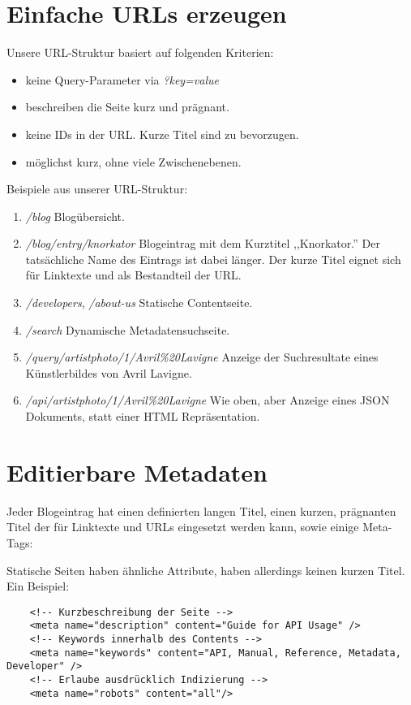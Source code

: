 \section{Einfache URLs erzeugen}
Unsere URL-Struktur basiert auf folgenden Kriterien:
\begin{itemize}
\item keine Query-Parameter via \emph{?key=value}
\item beschreiben die Seite kurz und prägnant.
\item keine IDs in der URL. Kurze Titel sind zu bevorzugen.
\item möglichst kurz, ohne viele Zwischenebenen.
\end{itemize}


Beispiele aus unserer URL-Struktur:
\begin{enumerate}
    \item \emph{/blog} Blogübersicht.
    \item \emph{/blog/entry/knorkator} Blogeintrag mit dem Kurztitel ,,Knorkator.''
          Der tatsächliche Name des Eintrags ist dabei länger. Der kurze Titel
          eignet sich für Linktexte und als Bestandteil der URL.
    \item \emph{/developers}, \emph{/about-us} Statische Contentseite.
    \item \emph{/search} Dynamische Metadatensuchseite.
    \item \emph{/query/artistphoto/1/Avril\%20Lavigne} Anzeige der Suchresultate
    eines Künstlerbildes von Avril Lavigne.
    \item \emph{/api/artistphoto/1/Avril\%20Lavigne} Wie oben, aber Anzeige
    eines JSON Dokuments, statt einer HTML Repräsentation.
\end{enumerate}

\section{Editierbare Metadaten}
Jeder Blogeintrag hat einen definierten langen Titel, einen kurzen, prägnanten
Titel der für Linktexte und URLs eingesetzt werden kann, sowie einige Meta-Tags:


Statische Seiten haben ähnliche Attribute, haben allerdings keinen kurzen Titel.
Ein Beispiel:

\begin{verbatim}
    <!-- Kurzbeschreibung der Seite -->
    <meta name="description" content="Guide for API Usage" />
    <!-- Keywords innerhalb des Contents -->
    <meta name="keywords" content="API, Manual, Reference, Metadata, Developer" />
    <!-- Erlaube ausdrücklich Indizierung -->
    <meta name="robots" content="all"/>
\end{verbatim}

